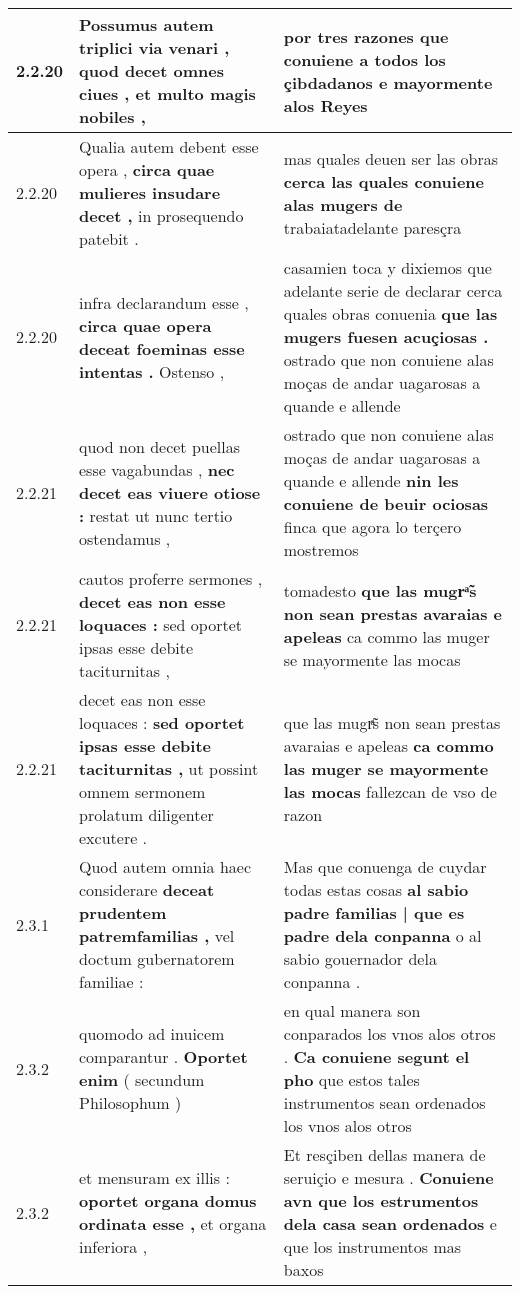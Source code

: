 \begin{tabular}{|p{1cm}|p{6.5cm}|p{6.5cm}|}
2.2.20 & Possumus autem triplici via venari , \textbf{ quod decet omnes ciues , } et multo magis nobiles , & por tres razones \textbf{ que conuiene a todos los çibdadanos } e mayormente alos Reyes \\\hline
2.2.20 & Qualia autem debent esse opera , \textbf{ circa quae mulieres insudare decet , } in prosequendo patebit . & mas quales deuen ser las obras \textbf{ cerca las quales conuiene alas mugers de } trabaiatadelante paresçra \\\hline
2.2.20 & infra declarandum esse , \textbf{ circa quae opera deceat foeminas esse intentas . } Ostenso , & casamien toca y dixiemos que adelante serie de declarar cerca quales obras conuenia \textbf{ que las mugers fuesen acuçiosas . } ostrado que non conuiene alas moças de andar uagarosas a quande e allende \\\hline
2.2.21 & quod non decet puellas esse vagabundas , \textbf{ nec decet eas viuere otiose : } restat ut nunc tertio ostendamus , & ostrado que non conuiene alas moças de andar uagarosas a quande e allende \textbf{ nin les conuiene de beuir ociosas } finca que agora lo terçero mostremos \\\hline
2.2.21 & cautos proferre sermones , \textbf{ decet eas non esse loquaces : } sed oportet ipsas esse debite taciturnitas , & tomadesto \textbf{ que las mugrͣ̃s non sean prestas avaraias e apeleas } ca commo las muger se mayormente las mocas \\\hline
2.2.21 & decet eas non esse loquaces : \textbf{ sed oportet ipsas esse debite taciturnitas , } ut possint omnem sermonem prolatum diligenter excutere . & que las mugrͣ̃s non sean prestas avaraias e apeleas \textbf{ ca commo las muger se mayormente las mocas } fallezcan de vso de razon \\\hline
2.3.1 & Quod autem omnia haec considerare \textbf{ deceat prudentem patremfamilias , } vel doctum gubernatorem familiae : & Mas que conuenga de cuydar todas estas cosas \textbf{ al sabio padre familias | que es padre dela conpanna } o al sabio gouernador dela conpanna . \\\hline
2.3.2 & quomodo ad inuicem comparantur . \textbf{ Oportet enim } ( secundum Philosophum ) & en qual manera son conparados los vnos alos otros . \textbf{ Ca conuiene segunt el pho } que estos tales instrumentos sean ordenados los vnos alos otros \\\hline
2.3.2 & et mensuram ex illis : \textbf{ oportet organa domus ordinata esse , } et organa inferiora , & Et resçiben dellas manera de seruiçio e mesura . \textbf{ Conuiene avn que los estrumentos dela casa sean ordenados } e que los instrumentos mas baxos \\\hline

\end{tabular}
